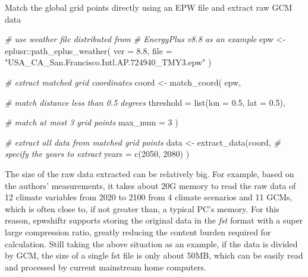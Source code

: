 \documentclass[twocolumn, a4paper,10pt]{article}
\newenvironment{Code}{\captionsetup{type=code}}{}
\newenvironment{Shaded}{\begin{mdframed}[skipabove=0pt]}{\end{mdframed}}
\newcommand{\AttributeTok}[1]{\textcolor[rgb]{0.77,0.63,0.00}{#1}}
\newcommand{\CommentTok}[1]{\textcolor[rgb]{0.56,0.35,0.01}{\textit{#1}}}
\newcommand{\DecValTok}[1]{\textcolor[rgb]{0.00,0.00,0.81}{#1}}
\newcommand{\FloatTok}[1]{\textcolor[rgb]{0.00,0.00,0.81}{#1}}
\newcommand{\FunctionTok}[1]{\textcolor[rgb]{0.00,0.00,0.00}{#1}}
\newcommand{\NormalTok}[1]{#1}
\newcommand{\OtherTok}[1]{\textcolor[rgb]{0.56,0.35,0.01}{#1}}
\newcommand{\SpecialCharTok}[1]{\textcolor[rgb]{0.00,0.00,0.00}{#1}}
\newcommand{\StringTok}[1]{\textcolor[rgb]{0.31,0.60,0.02}{#1}}
\begin{document}
\begin{Code}
\caption{Match the global grid points directly using an EPW file and  extract raw GCM data}

\label{lst:data}

\begin{Shaded}
\begin{Highlighting}[]
\CommentTok{\# use weather file distributed from}
\CommentTok{\# EnergyPlus v8.8 as an example}
\NormalTok{epw }\OtherTok{\textless{}{-}}\NormalTok{ eplusr}\SpecialCharTok{::}\FunctionTok{path\_eplus\_weather}\NormalTok{(}
  \AttributeTok{ver =} \FloatTok{8.8}\NormalTok{,}
  \AttributeTok{file =} \StringTok{"USA\_CA\_San.Francisco.Intl.AP.724940\_TMY3.epw"}
\NormalTok{)}

\CommentTok{\# extract matched grid coordinates}
\NormalTok{coord }\OtherTok{\textless{}{-}} \FunctionTok{match\_coord}\NormalTok{(}
\NormalTok{  epw,}

  \CommentTok{\# match distance less than 0.5 degrees}
  \AttributeTok{threshold =} \FunctionTok{list}\NormalTok{(}\AttributeTok{lon =} \FloatTok{0.5}\NormalTok{, }\AttributeTok{lat =} \FloatTok{0.5}\NormalTok{),}

  \CommentTok{\# match at most 3 grid points}
  \AttributeTok{max\_num =} \DecValTok{3}
\NormalTok{)}

\CommentTok{\# extract all data from matched grid points}
\NormalTok{data }\OtherTok{\textless{}{-}} \FunctionTok{extract\_data}\NormalTok{(coord,}
  \CommentTok{\# specify the years to extract}
  \AttributeTok{years =} \FunctionTok{c}\NormalTok{(}\DecValTok{2050}\NormalTok{, }\DecValTok{2080}\NormalTok{)}
\NormalTok{)}
\end{Highlighting}
\end{Shaded}

\end{Code}

The size of the raw data extracted can be relatively big. For example, based on
the authors' measurements, it takes about 20G memory to read the raw data of 12
climate variables from 2020 to 2100 from 4 climate scenarios and 11 GCMs, which
is often close to, if not greater than, a typical PC's memory. For this reason,
epwshiftr supports storing the original data in the \emph{fst} format \citep{mark2022fst}
with a super large compression ratio, greatly reducing the content burden
required for calculation. Still taking the above situation as an example, if the
data is divided by GCM, the size of a single fst file is only about 50MB, which
can be easily read and processed by current mainstream home computers.
\end{document}
